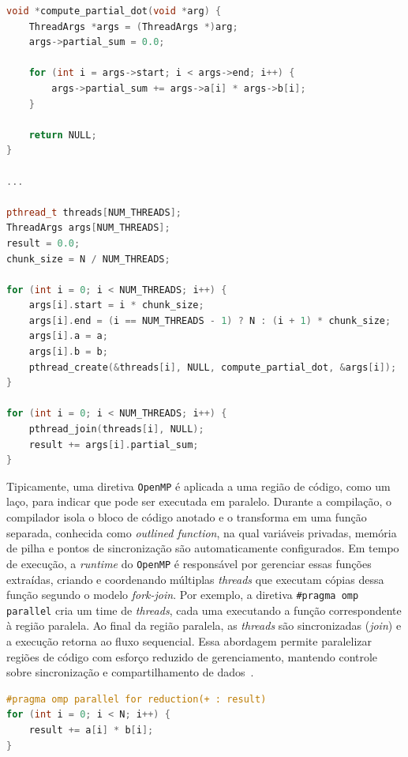\begin{sourcecode}[htb]
    \caption{Implementação paralelizada com \texttt{pthreads} de um produto escalar.}
    \label{code:produtoThread}
    \begin{lstlisting}[frame=single, framesep=0pt, language=C++]
void *compute_partial_dot(void *arg) {
    ThreadArgs *args = (ThreadArgs *)arg;
    args->partial_sum = 0.0;
    
    for (int i = args->start; i < args->end; i++) {
        args->partial_sum += args->a[i] * args->b[i];
    }

    return NULL;
}

...

pthread_t threads[NUM_THREADS];
ThreadArgs args[NUM_THREADS];
result = 0.0;
chunk_size = N / NUM_THREADS;

for (int i = 0; i < NUM_THREADS; i++) {
    args[i].start = i * chunk_size;
    args[i].end = (i == NUM_THREADS - 1) ? N : (i + 1) * chunk_size;
    args[i].a = a;
    args[i].b = b;
    pthread_create(&threads[i], NULL, compute_partial_dot, &args[i]);
}

for (int i = 0; i < NUM_THREADS; i++) {
    pthread_join(threads[i], NULL);
    result += args[i].partial_sum;    
}\end{lstlisting}
    \fonte{}
\end{sourcecode}

Tipicamente, uma diretiva \texttt{OpenMP} é aplicada a uma região de código, como um laço, para indicar que pode ser executada em paralelo. Durante a compilação, o compilador isola o bloco de código anotado e o transforma em uma função separada, conhecida como \textit{outlined function}, na qual variáveis privadas, memória de pilha e pontos de sincronização são automaticamente configurados. Em tempo de execução, a \textit{runtime} do \texttt{OpenMP} é responsável por gerenciar essas funções extraídas, criando e coordenando múltiplas \textit{threads} que executam cópias dessa função segundo o modelo \textit{fork-join}. Por exemplo, a diretiva \texttt{\#pragma omp parallel} cria um time de \textit{threads}, cada uma executando a função correspondente à região paralela. Ao final da região paralela, as \textit{threads} são sincronizadas (\textit{join}) e a execução retorna ao fluxo sequencial. Essa abordagem permite paralelizar regiões de código com esforço reduzido de gerenciamento, mantendo controle sobre sincronização e compartilhamento de dados~\cite{mattson2019}.

\begin{sourcecode}[htb]
    \caption{Implementação paralelizada com OpenMP de um produto escalar.}
    \label{code:produtoOmp}
    \begin{lstlisting}[frame=single, framesep=0pt, language=C++]
#pragma omp parallel for reduction(+ : result)
for (int i = 0; i < N; i++) {
    result += a[i] * b[i];
}\end{lstlisting}
    \fonte{}
\end{sourcecode}


